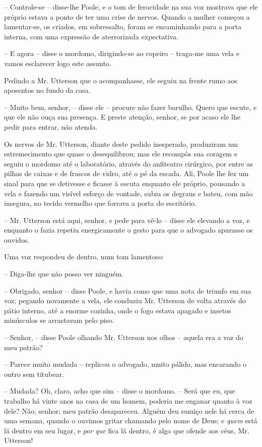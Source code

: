 -- Controle-se -- disse-lhe Poole, e o tom de ferocidade na sua voz
mostrava que ele próprio estava a ponto de ter uma crise de nervos. 
Quando a mulher começou a lamentar-se, os criados, em sobressalto,
foram se encaminhando para a porta interna, com uma expressão de
aterrorizada expectativa. 

-- E agora -- disse o mordomo, dirigindo-se ao copeiro -- traga-me uma
vela e vamos esclarecer logo este assunto.

Pedindo a Mr. Utterson que o acompanhasse, ele seguiu na frente rumo aos
aposentos no fundo da casa.

-- Muito bem, senhor, -- disse ele -- procure não fazer barulho.  Quero
que escute, e que ele não ouça sua presença.  E preste atenção, senhor,
se por acaso ele lhe pedir para entrar, não atenda.

Os nervos de Mr. Utterson, diante deste pedido inesperado, produziram um
estremecimento que quase o desequilibrou; mas ele recompôs sua coragem
e seguiu o mordomo até o laboratório, através do anfiteatro cirúrgico,
por entre as pilhas de caixas e de frascos de vidro, até o pé da
escada.  Ali, Poole lhe fez um sinal para que se detivesse e ficasse à
escuta enquanto ele próprio, pousando a vela e fazendo um visível
esforço de vontade, subiu os degraus e bateu, com mão insegura, no
tecido vermelho que forrava a porta do escritório.

-- Mr. Utterson está aqui, senhor, e pede para vê-lo -- disse ele
elevando a voz, e enquanto o fazia repetiu energicamente o gesto para
que o advogado apurasse os ouvidos.

Uma voz respondeu de dentro, num tom lamentoso:

-- Diga-lhe que não posso ver ninguém.

-- Obrigado, senhor -- disse Poole, e havia como que uma nota de triunfo
em sua voz; pegando novamente a vela, ele conduziu Mr. Utterson de
volta através do pátio interno, até a enorme cozinha, onde o fogo
estava apagado e insetos minúsculos se arrastavam pelo piso. 

-- Senhor, -- disse Poole olhando Mr. Utterson nos olhos -- aquela era a
voz do meu patrão?

-- Parece muito mudada -- replicou o advogado, muito pálido, mas
encarando o outro sem titubear.

-- Mudada? Oh, claro, acho que sim -- disse o mordomo. -- Será que eu,
que trabalho há vinte anos na casa de um homem, poderia me enganar
quanto à voz dele?  Não, senhor; meu patrão desapareceu. Alguém deu
sumiço nele há cerca de uma semana, quando o ouvimos gritar chamando
pelo nome de Deus; e \textit{quem} está lá dentro em seu lugar, e
\textit{por que }fica lá dentro, é algo que ofende aos céus, Mr.
Utterson!

